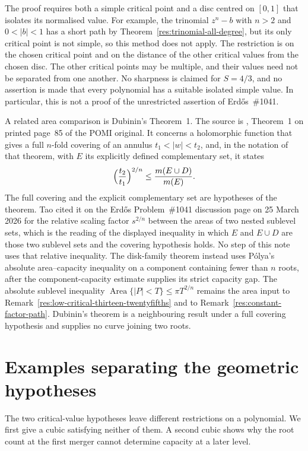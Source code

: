 \documentclass[11pt]{article}
\begin{document}
The proof requires both a simple critical point and a disc centred on
$[0,1]$ that isolates its normalised value. For example, the trinomial
$z^n-b$ with $n>2$ and $0<|b|<1$ has a short path by
Theorem~\ref{res:trinomial-all-degree}, but its only critical point is not
simple, so this method does not apply. The restriction is on the chosen
critical point and on the distance of the other critical values from the
chosen disc. The other critical points may be multiple, and their values
need not be separated from one another. No sharpness is claimed for
$S=4/3$, and no assertion is made that every polynomial has a suitable
isolated simple value. In particular, this is not a proof of the
unrestricted assertion of Erd\H{o}s~\#1041.

A related area comparison is Dubinin's Theorem~1. The
source is \cite{dubinin}, Theorem~1 on printed page~85 of the POMI original.
It concerns a holomorphic function that gives a full $n$-fold covering of an
annulus $t_1<|w|<t_2$, and, in the notation of that theorem, with $E$ its
explicitly defined complementary set, it states
\[
 \Bigl(\frac{t_2}{t_1}\Bigr)^{2/n}\le\frac{m(E\cup D)}{m(E)}.
\]
The full covering and the explicit complementary set are hypotheses of the
theorem.  Tao cited it on the Erd\H{o}s Problem~\#1041 discussion page on
25 March 2026 for the relative scaling factor $s^{2/n}$ between the areas of
two nested sublevel sets, which is the reading of the displayed inequality in
which $E$ and $E\cup D$ are those two sublevel sets and the covering
hypothesis holds.  No step of this note uses that relative inequality.  The
disk-family theorem instead uses P\'olya's absolute area--capacity inequality
on a component containing fewer than $n$ roots, after the
component-capacity estimate supplies its strict
capacity gap.  The absolute sublevel inequality
$\operatorname{Area}\{|P|<T\}\le\pi T^{2/n}$ remains the area input to
Remark~\ref{res:low-critical-thirteen-twentyfifths} and to
Remark~\ref{res:constant-factor-path}.  Dubinin's theorem is a neighbouring
result under a full covering hypothesis and supplies no curve joining two roots.

\section{Examples separating the geometric hypotheses}\label{sec:component-examples}

The two critical-value hypotheses leave different restrictions on a
polynomial. We first give a cubic satisfying neither of them. A second
cubic shows why the root count at the first merger cannot determine
capacity at a later level.
\end{document}
